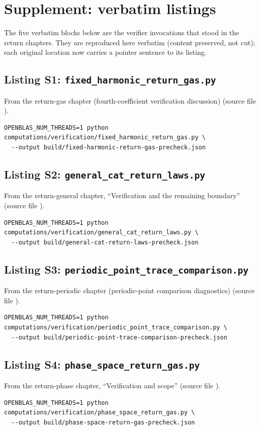 \section*{Supplement: verbatim listings}
The five verbatim blocks below are the verifier invocations that stood in the return chapters. They are reproduced here verbatim (content preserved, not cut); each original location now carries a pointer sentence to its listing.
\subsection*{Listing S1: \texttt{fixed\_harmonic\_return\_gas.py}}
From the return-gas chapter (fourth-coefficient verification discussion) (source file ).
\begin{verbatim}
OPENBLAS_NUM_THREADS=1 python computations/verification/fixed_harmonic_return_gas.py \
  --output build/fixed-harmonic-return-gas-precheck.json
\end{verbatim}
\subsection*{Listing S2: \texttt{general\_cat\_return\_laws.py}}
From the return-general chapter, ``Verification and the remaining boundary'' (source file ).
\begin{verbatim}
OPENBLAS_NUM_THREADS=1 python computations/verification/general_cat_return_laws.py \
  --output build/general-cat-return-laws-precheck.json
\end{verbatim}
\subsection*{Listing S3: \texttt{periodic\_point\_trace\_comparison.py}}
From the return-periodic chapter (periodic-point comparison diagnostics) (source file ).
\begin{verbatim}
OPENBLAS_NUM_THREADS=1 python computations/verification/periodic_point_trace_comparison.py \
  --output build/periodic-point-trace-comparison-precheck.json
\end{verbatim}
\subsection*{Listing S4: \texttt{phase\_space\_return\_gas.py}}
From the return-phase chapter, ``Verification and scope'' (source file ).
\begin{verbatim}
OPENBLAS_NUM_THREADS=1 python computations/verification/phase_space_return_gas.py \
  --output build/phase-space-return-gas-precheck.json
\end{verbatim}
